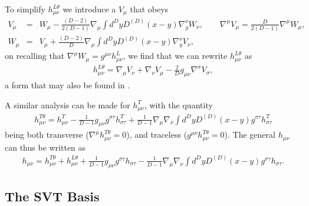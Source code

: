 \documentclass[aps]{revtex4}
\begin{document}
To simplify $h^{L\theta}_{\mu\nu}$ we introduce a  $V_{\mu}$ that obeys
%
\begin{eqnarray}
V_{\mu}&=&W_{\mu}-\frac{(D-2)}{2(D-1)}\nabla_{\mu}\int d^Dy D^{(D)}(x-y)\nabla_y^{\nu}W_{\nu},
\qquad
\nabla^{\mu}V_{\mu}=\frac{D}{2(D-1)}\nabla^{\mu}W_{\mu},
\nonumber\\
W_{\mu}&=&V_{\mu}+\frac{(D-2)}{D}\nabla_{\mu}\int d^Dy D^{(D)}(x-y)\nabla_y^{\nu}V_{\nu},
\label{E14}
\end{eqnarray}
%
on recalling that  $\nabla^{\mu}W_{\mu}=g^{\mu\nu}h^{L}_{\mu\nu}$, we find that we can rewrite $h^{L\theta}_{\mu\nu}$ as
%
\begin{eqnarray}
h^{L\theta}_{\mu\nu}= \nabla_{\mu}V_{\nu}+\nabla_{\nu}V_{\mu}-\frac{2}{D}g_{\mu\nu}\nabla^{\sigma}V_{\sigma},
\label{E15}
\end{eqnarray}
%
a form that may also be found in \cite{York1973}. 

A similar analysis can be made for $h^T_{\mu\nu}$, with the quantity 
%
\begin{eqnarray}
h^{T\theta}_{\mu\nu}= h^{T}_{\mu\nu}-\frac{1}{D-1}g_{\mu\nu}g^{\sigma\tau}h^{T}_{\sigma\tau}
+\frac{1}{D-1}\nabla_{\mu}\nabla_{\nu}\int d^Dy D^{(D)}(x-y)g^{\sigma\tau}h^{T}_{\sigma\tau}
\label{E16}
\end{eqnarray}
%
being both transverse ($\nabla^{\mu}h^{T\theta}_{\mu\nu}=0$), and traceless ($g^{\mu\nu}h^{T\theta}_{\mu\nu}=0$).
The general $h_{\mu\nu}$ can thus be written as 
%
\begin{eqnarray}
h_{\mu\nu}=h^{T\theta}_{\mu\nu}+h^{L\theta}_{\mu\nu}+\frac{1}{D-1}g_{\mu\nu}g^{\sigma\tau}h_{\sigma\tau}
-\frac{1}{D-1}\nabla_{\mu}\nabla_{\nu}\int d^Dy D^{(D)}(x-y)g^{\sigma\tau}h_{\sigma\tau}.
\label{E17}
\end{eqnarray}
%

\subsection{The SVT Basis}
\end{document}
